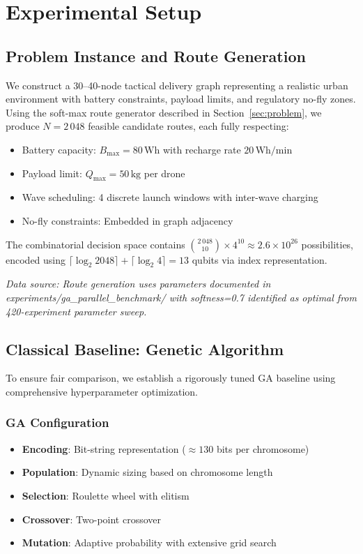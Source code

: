 \section{Experimental Setup}
\label{sec:experiments}

\subsection{Problem Instance and Route Generation}

We construct a 30--40-node tactical delivery graph representing a realistic urban environment with battery constraints, payload limits, and regulatory no-fly zones.
Using the soft-max route generator described in Section~\ref{sec:problem}, we produce $N = 2\,048$ feasible candidate routes, each fully respecting:
\begin{itemize}[nosep]
    \item Battery capacity: $B_{\max} = 80\,\text{Wh}$ with recharge rate $20\,\text{Wh/min}$
    \item Payload limit: $Q_{\max} = 50\,\text{kg}$ per drone
    \item Wave scheduling: 4 discrete launch windows with inter-wave charging
    \item No-fly constraints: Embedded in graph adjacency
\end{itemize}

The combinatorial decision space contains ${2\,048 \choose 10} \times 4^{10} \approx 2.6 \times 10^{26}$ possibilities, encoded using $\lceil\log_2 2048\rceil + \lceil\log_2 4\rceil = 13$ qubits via index representation.

\textit{Data source: Route generation uses parameters documented in experiments/ga\_parallel\_benchmark/ with softness=0.7 identified as optimal from 420-experiment parameter sweep.}

\subsection{Classical Baseline: Genetic Algorithm}

To ensure fair comparison, we establish a rigorously tuned GA baseline using comprehensive hyperparameter optimization.

\subsubsection{GA Configuration}
\begin{itemize}[nosep]
    \item \textbf{Encoding}: Bit-string representation ($\approx 130$ bits per chromosome)
    \item \textbf{Population}: Dynamic sizing based on chromosome length 
    \item \textbf{Selection}: Roulette wheel with elitism
    \item \textbf{Crossover}: Two-point crossover
    \item \textbf{Mutation}: Adaptive probability with extensive grid search
\end{itemize}

